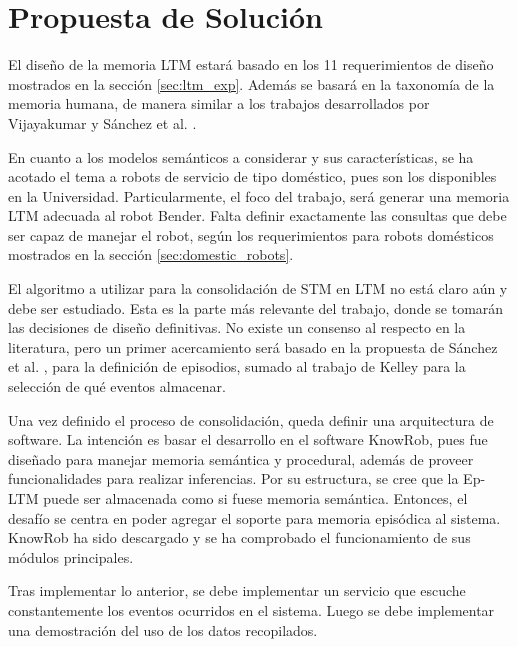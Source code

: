 \section{Propuesta de Solución}

%


El diseño de la memoria LTM estará basado en los 11 requerimientos de diseño mostrados en la sección \ref{sec:ltm_exp}. Además se basará en la taxonomía de la memoria humana, de manera similar a los trabajos desarrollados por Vijayakumar  \cite{Vijayakumar2014} y Sánchez et al. \cite{Sanchez:2015}.

En cuanto a los modelos semánticos a considerar y sus características, se ha acotado el tema a robots de servicio de tipo doméstico, pues son los disponibles en la Universidad. Particularmente, el foco del trabajo, será generar una memoria LTM adecuada al robot Bender. Falta definir exactamente las consultas que debe ser capaz de manejar el robot, según los requerimientos para robots domésticos mostrados en la sección \ref{sec:domestic_robots}.

El algoritmo a utilizar para la consolidación de STM en LTM no está claro aún y debe ser estudiado. Esta es la parte más relevante del trabajo, donde se tomarán las decisiones de diseño definitivas. No existe un consenso al respecto en la literatura, pero un primer acercamiento será basado en la propuesta de Sánchez et al.  \cite{Sanchez:2015}, para la definición de episodios, sumado al trabajo de Kelley  \cite{Kelley2014} para la selección de qué eventos almacenar.

Una vez definido el proceso de consolidación, queda definir una arquitectura de software. La intención es basar el desarrollo en el software KnowRob, pues fue diseñado para manejar memoria semántica y procedural, además de proveer funcionalidades para realizar inferencias. Por su estructura, se cree que la Ep-LTM puede ser almacenada como si fuese memoria semántica. Entonces, el desafío se centra en poder agregar el soporte para memoria episódica al sistema. KnowRob ha sido descargado y se ha comprobado el funcionamiento de sus módulos principales.

Tras implementar lo anterior, se debe implementar un servicio que escuche constantemente los eventos ocurridos en el sistema. Luego se debe implementar una demostración del uso de los datos recopilados.

